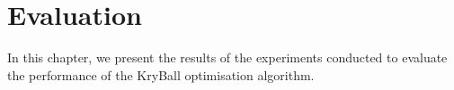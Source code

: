 \chapter{Evaluation}
\label{chap:evaluation}

In this chapter, we present the results of the experiments conducted to evaluate the performance of the KryBall optimisation algorithm.


